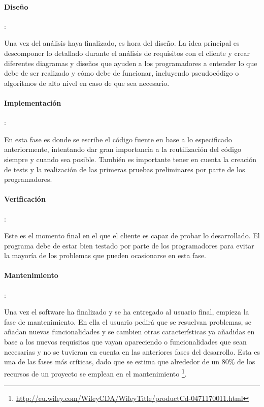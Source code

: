 \paragraph{Diseño}: 

Una vez del análisis haya finalizado, es hora del diseño. La idea principal es descomponer lo detallado durante el análisis de requisitos con el cliente y crear diferentes diagramas y diseños que ayuden a los programadores a entender lo que debe de ser realizado y cómo debe de funcionar, incluyendo pseudocódigo o algoritmos de alto nivel en caso de que sea necesario.

\paragraph{Implementación}:

En esta fase es donde se escribe el código fuente en base a lo especificado anteriormente, intentando dar gran importancia a la reutilización del código siempre y cuando sea posible. También es importante tener en cuenta la creación de tests y la realización de las primeras pruebas preliminares por parte de los programadores.

\paragraph{Verificación}:

Este es el momento final en el que el cliente es capaz de probar lo desarrollado. El programa debe de estar bien testado por parte de los programadores para evitar la mayoría de los problemas que pueden ocasionarse en esta fase.

\paragraph{Mantenimiento}:

Una vez el software ha finalizado y se ha entregado al usuario final, empieza la fase de mantenimiento. En ella el usuario pedirá que se resuelvan problemas, se añadan nuevas funcionalidades y se cambien otras características ya añadidas en base a los nuevos requisitos que vayan apareciendo o funcionalidades que sean necesarias y no se tuvieran en cuenta en las anteriores fases del desarrollo. Esta es una de las fases más críticas, dado que se estima que alrededor de un 80\% de los recursos de un proyecto se emplean en el mantenimiento \footnote{\url{http://eu.wiley.com/WileyCDA/WileyTitle/productCd-0471170011.html}}.

